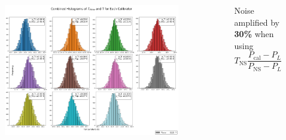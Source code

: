 \documentclass[aspectratio=169]{beamer}
\begin{document}
\begin{frame}
	\begin{columns}
		\begin{column}{0.8\textwidth}
			\begin{figure}[h]
				\centering
				\includegraphics[width=0.9\textwidth]{images/combined_histograms.png}
			\end{figure}
		\end{column}
		\begin{column}{0.2\textwidth}
			Noise amplified by \textbf{30\%} when using
			\[
				T_{\text{NS}} \frac{P_{\text{cal}} - P_L}{P_{\text{NS}} - P_L} + T_L
			\]
		\end{column}
	\end{columns}
\end{frame}
\end{document}
